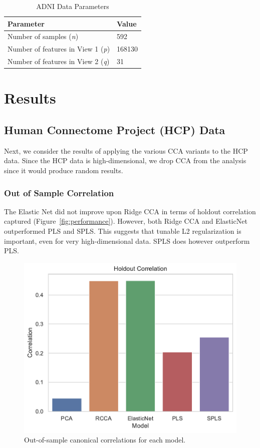 \begin{table}
\centering
\caption{ADNI Data Parameters}
\begin{tabular}{| l | l |}
\hline
\textbf{Parameter} & \textbf{Value} \\
\hline
Number of samples (\textit{n}) & 592 \\
Number of features in View 1 (\textit{p}) & 168130 \\
Number of features in View 2 (\textit{q}) & 31 \\
\hline
\end{tabular}\label{tab:adni-parameters}
\end{table}

\newpage
\newpage
\section{Results}

\subsection{Human Connectome Project (HCP) Data}

Next, we consider the results of applying the various CCA variants to the HCP data.
Since the HCP data is high-dimensional, we drop CCA from the analysis since it would produce random results.

\subsubsection{Out of Sample Correlation}

The Elastic Net did not improve upon Ridge CCA in terms of holdout correlation captured (Figure~\ref{fig:performance}).
However, both Ridge CCA and ElasticNet outperformed PLS and SPLS.
This suggests that tunable L2 regularization is important, even for very high-dimensional data.
SPLS does however outperform PLS.

\begin{figure}
\centering
\includegraphics[width=0.5\linewidth]{figures/hcp/holdout_correlations}
\caption{Out-of-sample canonical correlations for each model.}
\end{figure}

